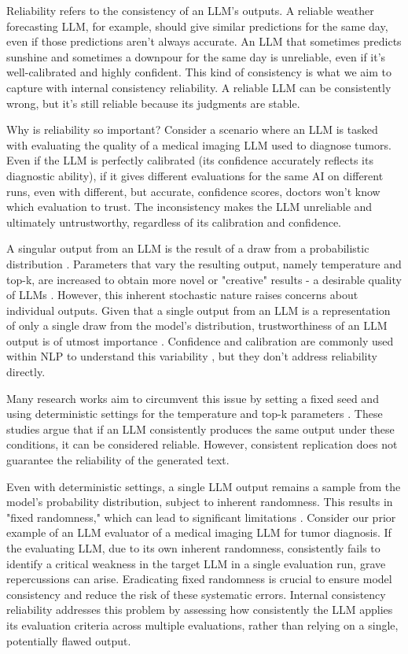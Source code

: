 \documentclass[11pt]{article}
\begin{document}
Reliability refers to the consistency of an LLM's outputs. A reliable weather forecasting LLM, for example, should give similar predictions for the same day, even if those predictions aren't always accurate. An LLM that sometimes predicts sunshine and sometimes a downpour for the same day is unreliable, even if it's well-calibrated and highly confident. This kind of consistency is what we aim to capture with internal consistency reliability.  A reliable LLM can be consistently wrong, but it's still reliable because its judgments are stable.



Why is reliability so important? Consider a scenario where an LLM is tasked with evaluating the quality of a medical imaging LLM used to diagnose tumors. Even if the LLM is perfectly calibrated (its confidence accurately reflects its diagnostic ability), if it gives different evaluations for the same AI on different runs, even with different, but accurate, confidence scores, doctors won't know which evaluation to trust. The inconsistency makes the LLM unreliable and ultimately untrustworthy, regardless of its calibration and confidence.

A singular output from an LLM is the result of a draw from a probabilistic distribution \citep{vaswani2017attention}. Parameters that vary the resulting output, namely temperature and top-k, are increased to obtain more novel or "creative" results - a desirable quality of LLMs \citep{peeperkorn2024temperature}. However, this inherent stochastic nature raises concerns about individual outputs. Given that a single output from an LLM is a representation of only a single draw from the model's distribution, trustworthiness of an LLM output is of utmost importance \citep{mittelstadt2023protect}. Confidence and calibration are commonly used within NLP to understand this variability \citep{lin2023generating, tian2023just}, but they don't address reliability directly.
  

Many research works aim to circumvent this issue by setting a fixed seed and using deterministic settings for the temperature and top-k parameters \citep{ouyang2023llm, wei2024systematic, atil2024llm}. These studies argue that if an LLM consistently produces the same output under these conditions, it can be considered reliable. However, consistent replication does not guarantee the reliability of the generated text. 

Even with deterministic settings, a single LLM output remains a sample from the model's probability distribution, subject to inherent randomness. This results in "fixed randomness," which can lead to significant limitations \citep{hellrich2016bad}. Consider our prior example of an LLM evaluator of a medical imaging LLM for tumor diagnosis. If the evaluating LLM, due to its own inherent randomness, consistently fails to identify a critical weakness in the target LLM in a single evaluation run, grave repercussions can arise. Eradicating fixed randomness is crucial to ensure model consistency and reduce the risk of these systematic errors. Internal consistency reliability addresses this problem by assessing how consistently the LLM applies its evaluation criteria across multiple evaluations, rather than relying on a single, potentially flawed output. 
\end{document}
